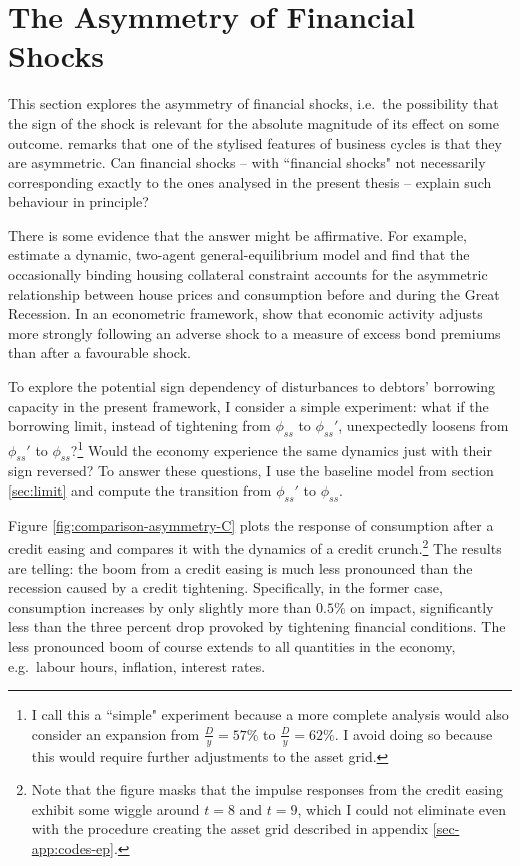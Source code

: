 \documentclass[a4paper,12pt]{article} %
\numberwithin{equation}{section} %
\numberwithin{figure}{section}
\numberwithin{table}{section}
\begin{document}
\section{The Asymmetry of Financial Shocks}
\label{sec:asymmetry}

This section explores the asymmetry of financial shocks, i.e.~the possibility that the sign of the
shock is relevant for the absolute magnitude of its effect on some outcome. \textcite{kocherlakota2000} remarks that one of the stylised features of business cycles is that they are asymmetric. Can financial shocks -- with ``financial shocks" not necessarily corresponding exactly to the ones analysed in the present thesis -- explain such behaviour in principle? 

There is some evidence that the answer might be affirmative. For example, \textcite{guerrieri2017asym} estimate a dynamic, two-agent general-equilibrium model and find that the occasionally binding housing collateral constraint accounts for the asymmetric relationship between house prices and consumption before and during the Great Recession. In an econometric framework, \textcite{barnichon2022} show that economic activity adjusts more strongly following an adverse shock to a measure of excess bond premiums than after a favourable shock.

To explore the potential sign dependency of disturbances to debtors' borrowing capacity in the present framework, I consider a simple experiment: what if the borrowing limit, instead of tightening from $\phi_{ss}$ to $\phi_{ss}'$, unexpectedly loosens from $\phi_{ss}'$ to $\phi_{ss}$?\footnote{I call this a ``simple" experiment because a more complete analysis would also consider an expansion from $\frac{D}{y} = 57\%$ to $\frac{D}{y} = 62\%$. I avoid doing so because this would require further adjustments to the asset grid.} Would the economy experience the same dynamics just with their sign reversed? To answer these questions, I use the baseline model from section \ref{sec:limit} and compute the transition from $\phi_{ss}'$ to $\phi_{ss}$.

Figure \ref{fig:comparison-asymmetry-C} plots the response of consumption after a credit easing and compares it with the dynamics of a credit crunch.\footnote{Note that the figure masks that the impulse responses from the credit easing exhibit some wiggle around $t=8$ and $t=9$, which I could not eliminate even with the procedure creating the asset grid described in appendix \ref{sec-app:codes-ep}.} The results are telling: the boom from a credit easing is much less pronounced than the recession caused by a credit tightening. Specifically, in the former case, consumption increases by only slightly more than $0.5\%$ on impact, significantly less than the three percent drop provoked by tightening financial conditions. The less pronounced boom of course extends to all quantities in the economy, e.g.~labour hours, inflation, interest rates.
\end{document}
